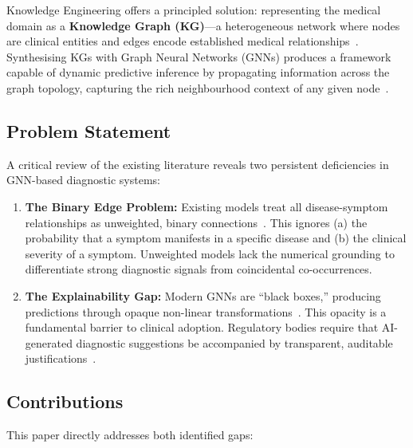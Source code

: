 \documentclass[conference]{IEEEtran}
\begin{document}
Knowledge Engineering offers a principled solution: representing the
medical domain as a \textbf{Knowledge Graph (KG)}---a heterogeneous
network where nodes are clinical entities and edges encode established
medical relationships~\cite{chandak2023building,su2023comprehensive}.
Synthesising KGs with Graph Neural Networks (GNNs) produces a framework
capable of dynamic predictive inference by propagating information
across the graph topology, capturing the rich neighbourhood context of
any given node~\cite{hu2020heterogeneous,gao2021medpath}.

\subsection{Problem Statement}

A critical review of the existing literature reveals two persistent
deficiencies in GNN-based diagnostic systems:

\begin{enumerate}
  \item \textbf{The Binary Edge Problem:} Existing models treat all
        disease-symptom relationships as unweighted, binary
        connections~\cite{sun2021disease}. This ignores (a) the
        probability that a symptom manifests in a specific disease and
        (b) the clinical severity of a symptom. Unweighted models lack
        the numerical grounding to differentiate strong diagnostic
        signals from coincidental co-occurrences.
  \item \textbf{The Explainability Gap:} Modern GNNs are ``black
        boxes,'' producing predictions through opaque non-linear
        transformations~\cite{yuan2023explainability,luo2020parameterized}.
        This opacity is a fundamental barrier to clinical adoption.
        Regulatory bodies require that AI-generated diagnostic
        suggestions be accompanied by transparent, auditable
        justifications~\cite{amann2020explainability}.
\end{enumerate}

\subsection{Contributions}

This paper directly addresses both identified gaps:
\end{document}
